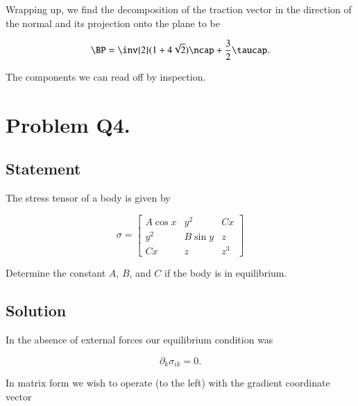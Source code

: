 Wrapping up, we find the decomposition of the traction vector in the direction of the normal and its projection onto the plane to be

\begin{equation}\label{eqn:continuumProblemSet1:510}
\BP 
= 
\inv{2}(1 + 4\sqrt{2}) \ncap
+
\frac{3}{2} \taucap.
\end{equation}

The components we can read off by inspection.

\section{Problem Q4.}
\subsection{Statement}

The stress tensor of a body is given by

\begin{equation}\label{eqn:continuumProblemSet1:90}
\sigma =
\begin{bmatrix}
A \cos x & y^2 & C x \\
y^2 & B \sin y & z \\
C x & z & z^3
\end{bmatrix}
\end{equation}

Determine the constant $A$, $B$, and $C$ if the body is in equilibrium.

\subsection{Solution}

In the absence of external forces our equilibrium condition was

\begin{equation}\label{eqn:continuumProblemSet1:530}
\partial_k \sigma_{ik} = 0.
\end{equation}

In matrix form we wish to operate (to the left) with the gradient coordinate vector

